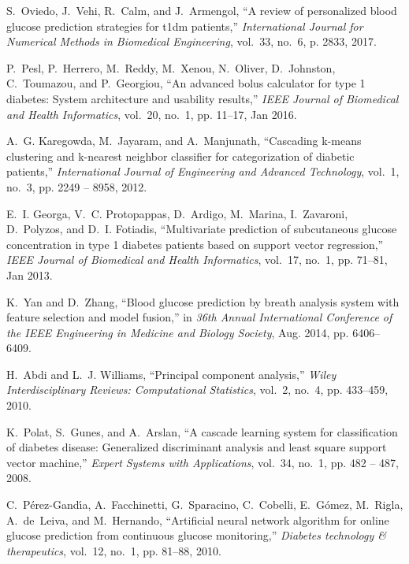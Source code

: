 \documentclass[a4paper, 10 pt, twocolumn]{IEEEtran}
\begin{document}
\begin{thebibliography}{10}
S.~Oviedo, J.~Vehi, R.~Calm, and J.~Armengol, ``A review of personalized blood
  glucose prediction strategies for t1dm patients,'' \emph{International
  Journal for Numerical Methods in Biomedical Engineering}, vol.~33, no.~6, p.
  2833, 2017.

P.~Pesl, P.~Herrero, M.~Reddy, M.~Xenou, N.~Oliver, D.~Johnston, C.~Toumazou,
  and P.~Georgiou, ``An advanced bolus calculator for type 1 diabetes: System
  architecture and usability results,'' \emph{IEEE Journal of Biomedical and
  Health Informatics}, vol.~20, no.~1, pp. 11--17, Jan 2016.

A.~G. Karegowda, M.~Jayaram, and A.~Manjunath, ``Cascading k-means clustering
  and k-nearest neighbor classifier for categorization of diabetic patients,''
  \emph{International Journal of Engineering and Advanced Technology}, vol.~1,
  no.~3, pp. 2249 -- 8958, 2012.

E.~I. Georga, V.~C. Protopappas, D.~Ardigo, M.~Marina, I.~Zavaroni, D.~Polyzos,
  and D.~I. Fotiadis, ``Multivariate prediction of subcutaneous glucose
  concentration in type 1 diabetes patients based on support vector
  regression,'' \emph{IEEE Journal of Biomedical and Health Informatics},
  vol.~17, no.~1, pp. 71--81, Jan 2013.

K.~Yan and D.~Zhang, ``Blood glucose prediction by breath analysis system with
  feature selection and model fusion,'' in \emph{36th Annual International
  Conference of the IEEE Engineering in Medicine and Biology Society}, Aug.
  2014, pp. 6406--6409.

H.~Abdi and L.~J. Williams, ``Principal component analysis,'' \emph{Wiley
  Interdisciplinary Reviews: Computational Statistics}, vol.~2, no.~4, pp.
  433--459, 2010.

K.~Polat, S.~Gunes, and A.~Arslan, ``A cascade learning system for
  classification of diabetes disease: Generalized discriminant analysis and
  least square support vector machine,'' \emph{Expert Systems with
  Applications}, vol.~34, no.~1, pp. 482 -- 487, 2008.

C.~P{\'e}rez-Gand{\'\i}a, A.~Facchinetti, G.~Sparacino, C.~Cobelli,
  E.~G{\'o}mez, M.~Rigla, A.~de~Leiva, and M.~Hernando, ``Artificial neural
  network algorithm for online glucose prediction from continuous glucose
  monitoring,'' \emph{Diabetes technology \& therapeutics}, vol.~12, no.~1, pp.
  81--88, 2010.


\end{thebibliography}
\end{document}
